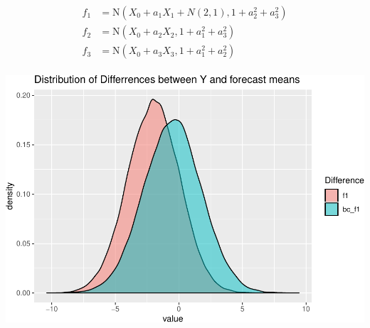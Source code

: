 \documentclass[]{article}
\begin{document}
\[
\begin{aligned}
f_1&=\text{N}(X_0+a_1X_1+N(2,1),1+a^2_2+a^2_3)\\
f_2&=\text{N}(X_0+a_2X_2,1+a^2_1+a^2_3)\\
f_3&=\text{N}(X_0+a_3X_3,1+a^2_1+a^2_2)\\
\end{aligned}
\]

\begin{center}\includegraphics[width=0.6\linewidth,height=0.6\textheight]{Newest_BLPsim_files/figure-latex/unnamed-chunk-6-1} \end{center}
\end{document}
